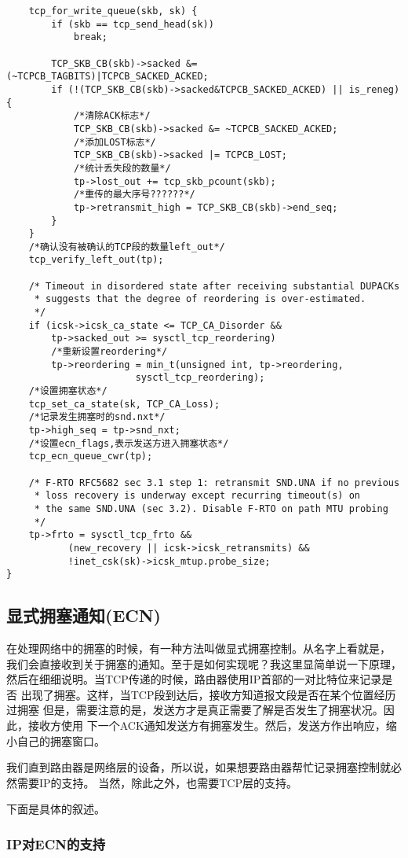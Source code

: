 \begin{verbatim}
	tcp_for_write_queue(skb, sk) {
		if (skb == tcp_send_head(sk))
			break;

		TCP_SKB_CB(skb)->sacked &= (~TCPCB_TAGBITS)|TCPCB_SACKED_ACKED;
		if (!(TCP_SKB_CB(skb)->sacked&TCPCB_SACKED_ACKED) || is_reneg) {
			/*清除ACK标志*/
			TCP_SKB_CB(skb)->sacked &= ~TCPCB_SACKED_ACKED;
			/*添加LOST标志*/			
			TCP_SKB_CB(skb)->sacked |= TCPCB_LOST;
			/*统计丢失段的数量*/			
			tp->lost_out += tcp_skb_pcount(skb);
			/*重传的最大序号??????*/
			tp->retransmit_high = TCP_SKB_CB(skb)->end_seq;
		}
	}
	/*确认没有被确认的TCP段的数量left_out*/
	tcp_verify_left_out(tp);

	/* Timeout in disordered state after receiving substantial DUPACKs
	 * suggests that the degree of reordering is over-estimated.
	 */
	if (icsk->icsk_ca_state <= TCP_CA_Disorder &&
	    tp->sacked_out >= sysctl_tcp_reordering)
		/*重新设置reordering*/
		tp->reordering = min_t(unsigned int, tp->reordering,
				       sysctl_tcp_reordering);
	/*设置拥塞状态*/	
	tcp_set_ca_state(sk, TCP_CA_Loss);
	/*记录发生拥塞时的snd.nxt*/
	tp->high_seq = tp->snd_nxt;
	/*设置ecn_flags,表示发送方进入拥塞状态*/	
	tcp_ecn_queue_cwr(tp);

	/* F-RTO RFC5682 sec 3.1 step 1: retransmit SND.UNA if no previous
	 * loss recovery is underway except recurring timeout(s) on
	 * the same SND.UNA (sec 3.2). Disable F-RTO on path MTU probing
	 */
	tp->frto = sysctl_tcp_frto &&
		   (new_recovery || icsk->icsk_retransmits) &&
		   !inet_csk(sk)->icsk_mtup.probe_size;
}
\end{verbatim}

	\subsection{显式拥塞通知(ECN)}
		在处理网络中的拥塞的时候，有一种方法叫做显式拥塞控制。从名字上看就是，
		我们会直接收到关于拥塞的通知。至于是如何实现呢？我这里显简单说一下原理，
		然后在细细说明。当TCP传递的时候，路由器使用IP首部的一对比特位来记录是否
		出现了拥塞。这样，当TCP段到达后，接收方知道报文段是否在某个位置经历过拥塞
		但是，需要注意的是，发送方才是真正需要了解是否发生了拥塞状况。因此，接收方使用
		下一个ACK通知发送方有拥塞发生。然后，发送方作出响应，缩小自己的拥塞窗口。

		我们直到路由器是网络层的设备，所以说，如果想要路由器帮忙记录拥塞控制就必然需要IP的支持。
		当然，除此之外，也需要TCP层的支持。

		下面是具体的叙述。

		\subsubsection{IP对ECN的支持}

